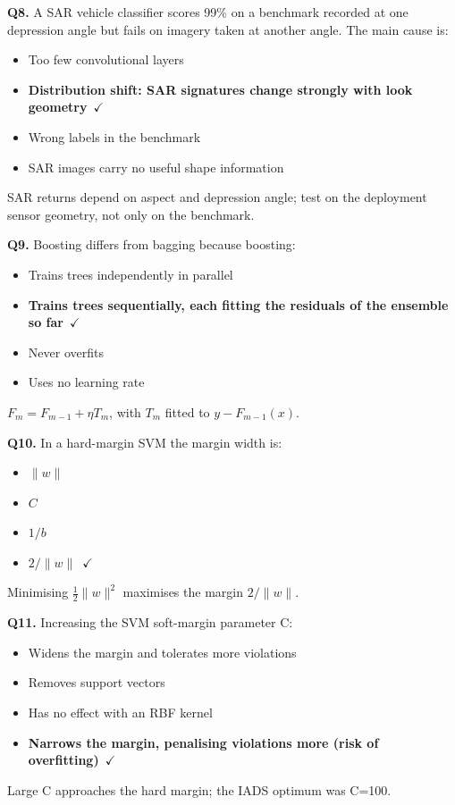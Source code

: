 \documentclass[11pt]{article}
\begin{document}
{\noindent\textbf{Q8.} A SAR vehicle classifier scores 99\% on a benchmark recorded at one depression angle but fails on imagery taken at another angle. The main cause is:\begin{itemize}[leftmargin=2.2em,itemsep=0pt,topsep=1pt]\item[A.] Too few convolutional layers\item[\textbf{B.}] \textbf{Distribution shift: SAR signatures change strongly with look geometry}~{\color{GrnN}$\checkmark$}\item[C.] Wrong labels in the benchmark\item[D.] SAR images carry no useful shape information\end{itemize} SAR returns depend on aspect and depression angle; test on the deployment sensor geometry, not only on the benchmark.\par\medskip

\noindent\textbf{Q9.} Boosting differs from bagging because boosting:\begin{itemize}[leftmargin=2.2em,itemsep=0pt,topsep=1pt]\item[A.] Trains trees independently in parallel\item[\textbf{B.}] \textbf{Trains trees sequentially, each fitting the residuals of the ensemble so far}~{\color{GrnN}$\checkmark$}\item[C.] Never overfits\item[D.] Uses no learning rate\end{itemize} $F_m=F_{m-1}+\eta T_m$, with $T_m$ fitted to $y-F_{m-1}(x)$.\par\medskip

\noindent\textbf{Q10.} In a hard-margin SVM the margin width is:\begin{itemize}[leftmargin=2.2em,itemsep=0pt,topsep=1pt]\item[A.] $\|w\|$\item[B.] $C$\item[C.] $1/b$\item[\textbf{D.}] \textbf{$2/\|w\|$}~{\color{GrnN}$\checkmark$}\end{itemize} Minimising $\tfrac12\|w\|^2$ maximises the margin $2/\|w\|$.\par\medskip

\noindent\textbf{Q11.} Increasing the SVM soft-margin parameter C:\begin{itemize}[leftmargin=2.2em,itemsep=0pt,topsep=1pt]\item[A.] Widens the margin and tolerates more violations\item[B.] Removes support vectors\item[C.] Has no effect with an RBF kernel\item[\textbf{D.}] \textbf{Narrows the margin, penalising violations more (risk of overfitting)}~{\color{GrnN}$\checkmark$}\end{itemize} Large C approaches the hard margin; the IADS optimum was C=100.\par\medskip

}
\end{document}
